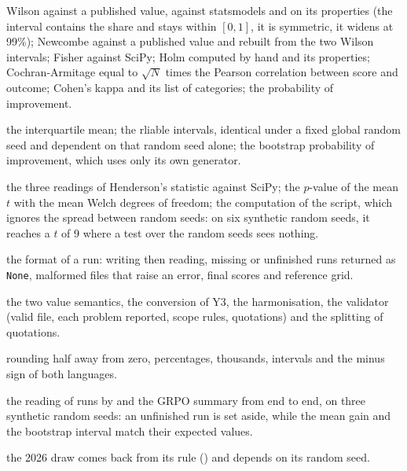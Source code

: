 \begin{description}[style=nextline,leftmargin=1.5em]
  \item[\file{test\_stats.py}] Wilson against a published value, against statsmodels and on its
        properties (the interval contains the share and stays within $[0,1]$, it is symmetric, it
        widens at 99\%); Newcombe against a published value and rebuilt from the two Wilson
        intervals; Fisher against SciPy; Holm computed by hand and its properties; Cochran-Armitage
        equal to $\sqrt N$ times the Pearson correlation between score and outcome; Cohen's kappa
        and its list of categories; the probability of improvement.
  \item[\file{test\_bootstrap.py}] the interquartile mean; the rliable intervals, identical under a
        fixed global random seed and dependent on that random seed alone; the bootstrap probability of
        improvement, which uses only its own generator.
  \item[\file{test\_henderson.py}] the three readings of Henderson's statistic against SciPy; the
        $p$-value of the mean $t$ with the mean Welch degrees of freedom; the computation of the
        script, which ignores the spread between random seeds: on six synthetic random seeds, it
        reaches a $t$ of 9 where a test over the random seeds sees nothing.
  \item[\file{test\_runs.py}] the format of a run: writing then reading, missing or unfinished runs
        returned as \texttt{None}, malformed files that raise an error, final scores and reference
        grid.
  \item[\file{test\_grid.py}] the two value semantics, the conversion of Y3, the harmonisation, the
        validator (valid file, each problem reported, scope rules, quotations) and the splitting of
        quotations.
  \item[\file{test\_formatting.py}] rounding half away from zero, percentages, thousands, intervals
        and the minus sign of both languages.
  \item[\file{test\_pipelines.py}] the reading of runs by  and the GRPO
        summary from end to end, on three synthetic random seeds: an unfinished run is set aside, while
        the mean gain and the bootstrap interval match their expected values.
  \item[\file{test\_draw.py}] the 2026 draw comes back from its rule () and
        depends on its random seed.
\end{description}

